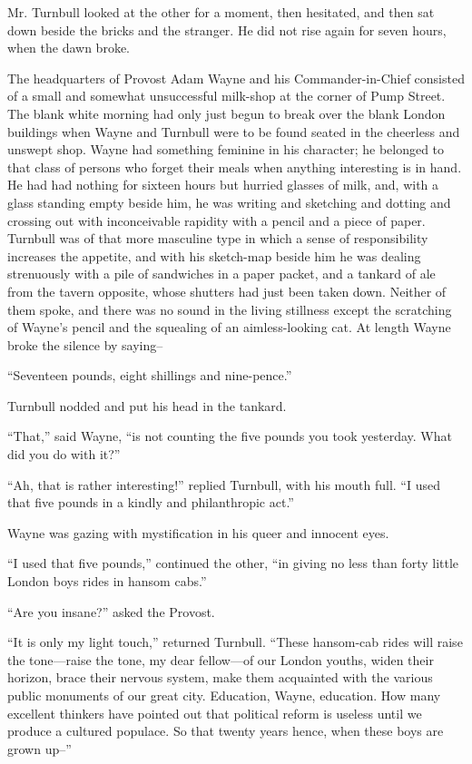 \documentclass{book}
\begin{document}
Mr. Turnbull looked at the other for a moment, then hesitated, and then sat down beside the bricks and the stranger. He did not rise again for seven hours, when the dawn broke.

The headquarters of Provost Adam Wayne and his Commander-in-Chief consisted of a small and somewhat unsuccessful milk-shop at the corner of Pump Street. The blank white morning had only just begun to break over the blank London buildings when Wayne and Turnbull were to be found seated in the cheerless and unswept shop. Wayne had something feminine in his character; he belonged to that class of persons who forget their meals when anything interesting is in hand. He had had nothing for sixteen hours but hurried glasses of milk, and, with a glass standing empty beside him, he was writing and sketching and dotting and crossing out with inconceivable rapidity with a pencil and a piece of paper. Turnbull was of that more masculine type in which a sense of responsibility increases the appetite, and with his sketch-map beside him he was dealing strenuously with a pile of sandwiches in a paper packet, and a tankard of ale from the tavern opposite, whose shutters had just been taken down. Neither of them spoke, and there was no sound in the living stillness except the scratching of Wayne’s pencil and the squealing of an aimless-looking cat. At length Wayne broke the silence by saying–

“Seventeen pounds, eight shillings and nine-pence.”

Turnbull nodded and put his head in the tankard.

“That,” said Wayne, “is not counting the five pounds you took yesterday. What did you do with it?”

“Ah, that is rather interesting!” replied Turnbull, with his mouth full. “I used that five pounds in a kindly and philanthropic act.”

Wayne was gazing with mystification in his queer and innocent eyes.

“I used that five pounds,” continued the other, “in giving no less than forty little London boys rides in hansom cabs.”

“Are you insane?” asked the Provost.

“It is only my light touch,” returned Turnbull. “These hansom-cab rides will raise the tone—raise the tone, my dear fellow—of our London youths, widen their horizon, brace their nervous system, make them acquainted with the various public monuments of our great city. Education, Wayne, education. How many excellent thinkers have pointed out that political reform is useless until we produce a cultured populace. So that twenty years hence, when these boys are grown up–”
\end{document}
